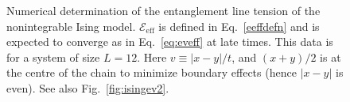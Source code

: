 \documentclass[aps,prx,twocolumn,superscriptaddress,floatfix,nofootinbib,prx]{revtex4}
\renewcommand{\>}{\right\rangle}
\newcommand{\<}{\left\langle}
\newcommand{\lt}{\mathcal{E}}
\begin{document}
\begin{figure}[t]
\caption{
Numerical determination of the entanglement line tension of the nonintegrable Ising model. $\lt_\text{eff}$ is defined in Eq.~\ref{eeffdefn} and is expected to converge as in Eq.~\ref{eq:eveff} at late times. This data is for a system of size $L=12$. Here ${v\equiv |x-y|/t}$, and $(x+y)/2$ is at the centre of the chain to minimize boundary effects (hence $|x-y|$ is even). See also Fig.~\ref{fig:isingev2}.
}  \label{fig:isingev}
\end{figure}
\end{document}
